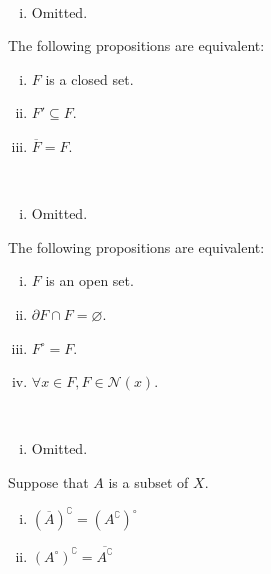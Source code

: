\documentclass{report}
\begin{document}
\begin{prf}~\\ \vspace{-1em}
	\begin{enumerate}[(i)]
		\item Omitted.
	\end{enumerate}
\end{prf}


\begin{proposition}{}{}
	The following propositions are equivalent:
	\begin{enumerate}[(i)]
		\item $F$ is a closed set.
		\item $F'\subseteq F$.
		\item $\overline{F}=F$.
	\end{enumerate}
\end{proposition}

\begin{prf}~\\ \vspace{-1em}
	\begin{enumerate}[(i)]
		\item Omitted.
	\end{enumerate}
\end{prf}


\begin{proposition}{}{}
	The following propositions are equivalent:
	\begin{enumerate}[(i)]
		\item $F$ is an open set.
		\item $\partial F\cap F=\varnothing$.
		\item $F^\circ=F$.
		\item $\forall x\in F,F\in \mathcal{N}(x)$.
	\end{enumerate}
\end{proposition}

\begin{prf}~\\ \vspace{-1em}
	\begin{enumerate}[(i)]
		\item Omitted.
	\end{enumerate}
\end{prf}


\begin{proposition}{}{}
	Suppose that $A$ is a subset of $X$.
	\begin{enumerate}[(i)]
		\item $(\overline{A})^{\complement}=(A^{\complement})^{\circ}$
		\item $(A^{\circ})^{\complement}=\overline{A^{\complement}}$
	\end{enumerate}
\end{proposition}
\end{document}
